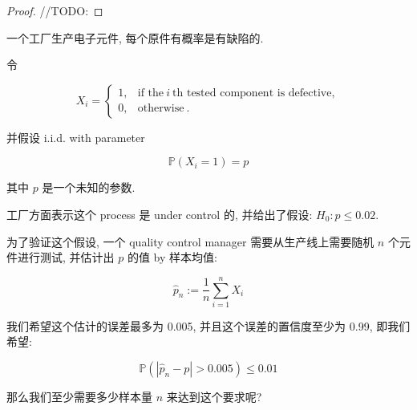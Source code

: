 \documentclass{qlnotes-export}
\begin{document}
\begin{proof}

//TODO:

\end{proof}

\begin{example}\label{ex-05-clt-example-003}

一个工厂生产电子元件, 每个原件有概率是有缺陷的.

令

\[X_{i} = \left\{ \begin{matrix}
{1,} & {\text{if the}\ i\ \text{th tested component is defective},} \\
{0,} & {\text{otherwise}\ .}
\end{matrix} \right.\]

并假设 i.i.d. with parameter

\[{\mathbb{P}}(X_{i} = 1) = p\]

其中 \(p\) 是一个未知的参数.

工厂方面表示这个 process 是 under control 的, 并给出了假设: \(H_{0}:p \leq 0.02\).

为了验证这个假设, 一个 quality control manager 需要从生产线上需要随机 \(n\) 个元件进行测试, 并估计出 \(p\) 的值 by 样本均值:

\[{\widehat{p}}_{n} := \frac{1}{n}\sum\limits_{i = 1}^{n}X_{i}\]

我们希望这个估计的误差最多为 0.005, 并且这个误差的置信度至少为 0.99, 即我们希望:

\[{\mathbb{P}}\left( {\left| {{\widehat{p}}_{n} - p} \right| > 0.005} \right) \leq 0.01\]

那么我们至少需要多少样本量 \(n\) 来达到这个要求呢?

\end{example}
\end{document}
